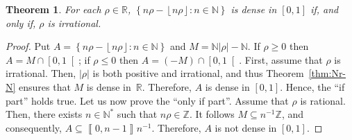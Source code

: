 \documentclass[12pt]{article}
\newcommand{\bZ}{\mathbb{Z}}
\newcommand{\bN}{\mathbb{N}} %
\newcommand{\bNast}{\bN^*} %
\newcommand{\bR}{\mathbb{R}}
\newcommand{\seg}[2]{\left\llbracket#1, #2 \right\rrbracket}
\newcommand{\floor}[1]{\left\lfloor #1  \right\rfloor}
\newcommand{\abs}[1]{\left| #1 \right|}
\newtheorem{theorem}{Theorem}
\theoremstyle{definition}
\begin{document}
\begin{theorem}
  For each $\rho \in \bR$,
   $\left\{ n \rho - \floor{n \rho} : n \in \bN \right\}$ is dense in $[0, 1]$ if, and only if,
   $\rho$ is irrational.
 \end{theorem}

 \begin{proof}
   Put
   $A = \left\{ n \rho - \floor{n \rho} : n \in \bN \right\}$ and $M = \bN \abs{ \rho } - \bN$.
   If $\rho \ge 0$ then $A = M \cap \left[0, 1 \right[$;
   if $\rho \le 0$ then $A = (- M) \cap \left[0, 1 \right[$.
   First, assume that $\rho$ is irrational.
   Then, $\abs{\rho}$ is both positive and irrational,
   and thus Theorem~\ref{thm:Nr-N} ensures that $M$ is dense in~$\bR$.
   Therefore, $A$ is dense in $[0, 1]$.
   Hence, the ``if part'' holds true.
   Let us now prove the ``only if part''.
   Assume that $\rho$ is rational.
   Then, there exists $n \in \bNast$ such that $n \rho \in \bZ$.
   It follows $M \subseteq n^{-1} \bZ$,
   and consequently,
   $A \subseteq \seg{0}{n - 1} n^{-1}$.  
   Therefore, $A$ is not dense in $[0, 1]$.
\end{proof}

 

 



\end{document}
